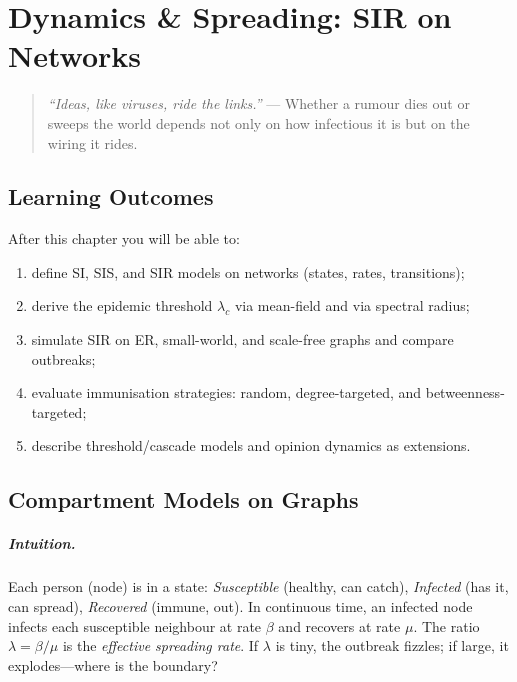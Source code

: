 \chapter{Dynamics \& Spreading: SIR on Networks}
\label{ch:spreading}
\sloppy

\begin{quote}
\emph{``Ideas, like viruses, ride the links.''} --- Whether a rumour dies out or sweeps the world depends not only on how infectious it is but on the wiring it rides.
\end{quote}

\noindent{}
\vspace{0.4em}

\section*{Learning Outcomes}
After this chapter you will be able to:
\begin{enumerate}[label=(L\arabic*)]
    \item define SI, SIS, and SIR models on networks (states, rates, transitions);
    \item derive the epidemic threshold $\lambda_c$ via mean-field and via spectral radius;
    \item simulate SIR on ER, small-world, and scale-free graphs and compare outbreaks;
    \item evaluate immunisation strategies: random, degree-targeted, and betweenness-targeted;
    \item describe threshold/cascade models and opinion dynamics as extensions.
\end{enumerate}

\section{Compartment Models on Graphs}
\label{sec:compartments}
\paragraph{Intuition.} Each person (node) is in a state: \emph{Susceptible} (healthy, can catch), \emph{Infected} (has it, can spread), \emph{Recovered} (immune, out). In continuous time, an infected node infects each susceptible neighbour at rate $\beta$ and recovers at rate $\mu$. The ratio $\lambda=\beta/\mu$ is the \emph{effective spreading rate}. If $\lambda$ is tiny, the outbreak fizzles; if large, it explodes---where is the boundary?

